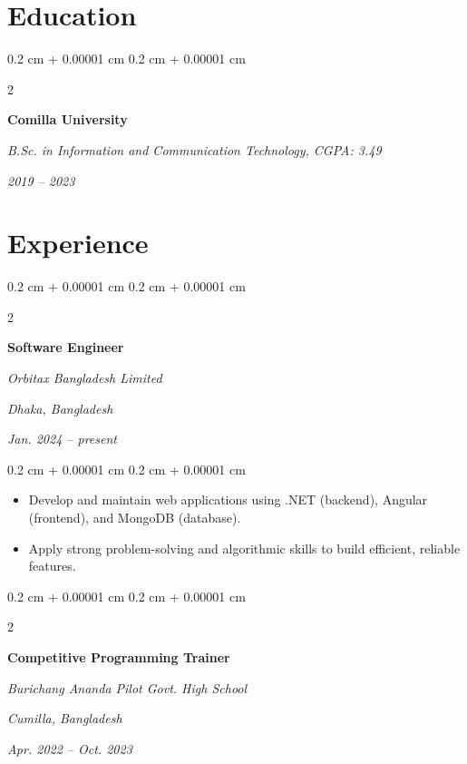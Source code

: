 \documentclass[10pt, letterpaper]{article}
\newenvironment{highlights}{
    \begin{itemize}[
        topsep=0.10 cm,
        parsep=0.10 cm,
        partopsep=0pt,
        itemsep=0pt,
        leftmargin=0.4 cm + 10pt
    ]
}{
    \end{itemize}
} %
\newenvironment{onecolentry}{
    \begin{adjustwidth}{
        0.2 cm + 0.00001 cm
    }{
        0.2 cm + 0.00001 cm
    }
}{
    \end{adjustwidth}
} %
\newenvironment{twocolentry}[2][]{
    \onecolentry
    \def\secondColumn{#2}
    \setcolumnwidth{\fill, 4.5 cm}
    \begin{paracol}{2}
}{
    \switchcolumn \raggedleft \secondColumn
    \end{paracol}
    \endonecolentry
} %
\begin{document}
    \section{Education}

        \begin{twocolentry}{
        \textit{2019 -- 2023}}
            \textbf{Comilla University}

            \textit{B.Sc. in Information and Communication Technology, CGPA: 3.49}
        \end{twocolentry}

    \section{Experience}

        \begin{twocolentry}{
        \textit{Dhaka, Bangladesh}

        \textit{Jan. 2024 -- present}}
            \textbf{Software Engineer}

            \textit{Orbitax Bangladesh Limited}
        \end{twocolentry}

        \vspace{0.10 cm}
        \begin{onecolentry}
            \begin{highlights}
                \item Develop and maintain web applications using .NET (backend), Angular (frontend), and MongoDB (database).
                \item Apply strong problem-solving and algorithmic skills to build efficient, reliable features.
            \end{highlights}
        \end{onecolentry}

        \vspace{0.2 cm}

        \begin{twocolentry}{
        \textit{Cumilla, Bangladesh}

        \textit{Apr. 2022 -- Oct. 2023}}
            \textbf{Competitive Programming Trainer}

            \textit{Burichang Ananda Pilot Govt. High School}
        \end{twocolentry}

        \vspace{0.2 cm}
\end{document}

